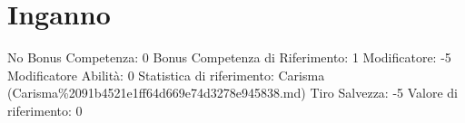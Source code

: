 \section{Inganno}\label{inganno}

\begin{description}
\tightlist
\item[Tags: ABI]
No Bonus Competenza: 0 Bonus Competenza di Riferimento: 1 Modificatore:
-5 Modificatore Abilità: 0 Statistica di riferimento: Carisma
(Carisma\%2091b4521e1ff64d669e74d3278e945838.md) Tiro Salvezza: -5
Valore di riferimento: 0
\end{description}
